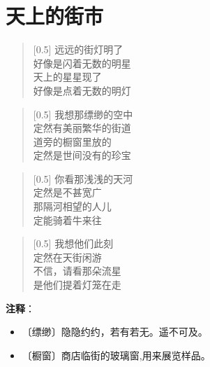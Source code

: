 \documentclass[12pt,UTF-8,openany]{ctexbook}
\begin{document}
\chapter{天上的街市}

\begin{large}
    
    \begin{verse}[0.5\linewidth]
        远远的街灯明了 \\
        好像是闪着无数的明星 \\
        天上的星星现了 \\
        好像是点着无数的明灯
    \end{verse}
    
    
    \begin{verse}[0.5\linewidth]
        我想那缥缈的空中 \\
        定然有美丽繁华的街道 \\
        道旁的橱窗里放的 \\
        定然是世间没有的珍宝
    \end{verse}
    
    
    \begin{verse}[0.5\linewidth]
        你看那浅浅的天河 \\
        定然是不甚宽广 \\
        那隔河相望的人儿 \\
        定能骑着牛来往
    \end{verse}
    
    
    \begin{verse}[0.5\linewidth]
        我想他们此刻 \\
        定然在天街闲游 \\
        不信，请看那朵流星 \\
        是他们提着灯笼在走
    \end{verse}
    
\end{large}


\newpage

\textbf{注释}：

\vspace{-1em}

\begin{itemize}
    \setlength\itemsep{-0.2em}
    \item 〔缥缈〕隐隐约约，若有若无。遥不可及。
    \item 〔橱窗〕商店临街的玻璃窗,用来展览样品。
\end{itemize}
\end{document}
